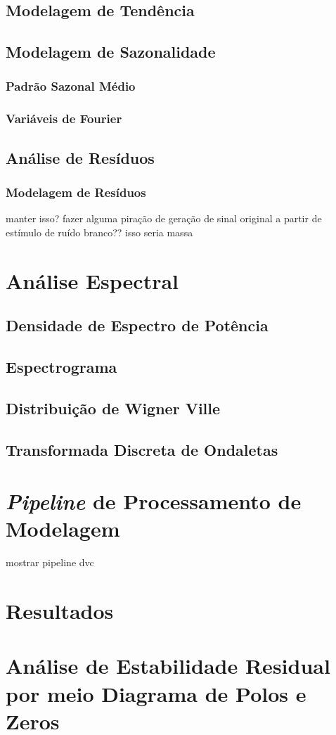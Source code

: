 \subsection{Modelagem de Tendência}

\subsection{Modelagem de Sazonalidade}

\subsubsection{Padrão Sazonal Médio}

\subsubsection{Variáveis de Fourier}

\subsection{Análise de Resíduos}

\subsubsection{Modelagem de Resíduos}

manter isso? fazer alguma piração de geração de sinal original a partir de
estímulo de ruído branco?? isso seria massa

\section{Análise Espectral}

\subsection{Densidade de Espectro de Potência}

\subsection{Espectrograma}

\subsection{Distribuição de Wigner Ville}

\subsection{Transformada Discreta de Ondaletas}

\section{\emph{Pipeline} de Processamento de Modelagem}

mostrar pipeline dvc%

\section{Resultados}

\section{Análise de Estabilidade Residual por meio Diagrama de Polos e Zeros}
